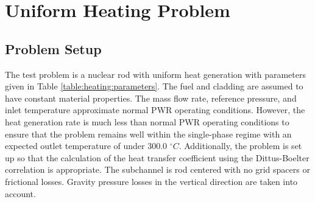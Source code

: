 \vspace*{-80mm}
\chapter{Uniform Heating Problem} \label{chapter7:uniform_heating}
 
\section{Problem Setup}


The test problem is a nuclear rod with uniform heat generation with parameters
given in Table \ref{table:heating:parameters}. The fuel and cladding are assumed
to have constant material properties. The mass flow rate, reference pressure, and inlet
temperature approximate normal PWR operating conditions. However, the heat
generation rate is much less than normal PWR operating conditions to ensure that
the problem remains well  within the single-phase regime with an expected outlet
temperature of under 300.0 $^{\circ}C$. Additionally, the problem is set
up so that the calculation of the heat transfer coefficient using the
Dittus-Boelter correlation \cite{Incropera1998} is appropriate. The subchannel
is rod centered with no grid spacers or frictional losses. Gravity pressure
losses in the vertical direction are taken into account. 

